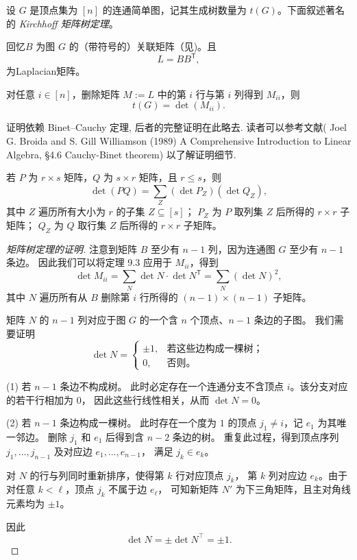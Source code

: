 设 $G$ 是顶点集为 $[n]$ 的连通简单图，记其生成树数量为 $t(G)$。下面叙述著名的
\emph{Kirchhoff 矩阵树定理}。

回忆$B$ 为图 $G$ 的（带符号的）关联矩阵（见)。且
\[
L = B B^{\mathsf T},
\]
为Laplacian矩阵。

\begin{theorem}[矩阵树定理]\label{thm:matrix-tree}
对任意 $i\in[n]$，删除矩阵 $M:=L$ 中的第 $i$ 行与第 $i$ 列得到 $M_{ii}$，则
\[
t(G)=\det(M_{ii}).
\]
\end{theorem}

证明依赖 Binet--Cauchy 定理, 后者的完整证明在此略去. 读者可以参考文献( Joel G. Broida and S. Gill Williamson (1989) A Comprehensive Introduction to Linear Algebra, §4.6 Cauchy-Binet theorem) 以了解证明细节.

\begin{theorem}\label{thm:binet-cauchy}
若 $P$ 为 $r\times s$ 矩阵，$Q$ 为 $s\times r$ 矩阵，且 $r\le s$，则
\[
\det(PQ)=\sum_{Z} (\det P_Z)(\det Q_Z),
\]
其中 $Z$ 遍历所有大小为 $r$ 的子集 $Z\subseteq [s]$；
$P_Z$ 为 $P$ 取列集 $Z$ 后所得的 $r\times r$ 子矩阵；
$Q_Z$ 为 $Q$ 取行集 $Z$ 后所得的 $r\times r$ 子矩阵。
\end{theorem}

\begin{proof}[ 矩阵树定理的证明]
注意到矩阵 $B$ 至少有 $n-1$ 列，因为连通图 $G$ 至少有 $n-1$ 条边。
因此我们可以将定理 9.3 应用于 $M_{ii}$，得到
\[
\det M_{ii}
  = \sum_{N} \det N \cdot \det N^{\mathsf T}
  = \sum_{N} (\det N)^2,
\]
其中 $N$ 遍历所有从 $B$ 删除第 $i$ 行所得的 $(n-1)\times(n-1)$ 子矩阵。

矩阵 $N$ 的 $n-1$ 列对应于图 $G$ 的一个含 $n$ 个顶点、$n-1$ 条边的子图。
我们需要证明
\[
\det N =
\begin{cases}
\pm 1, & \text{若这些边构成一棵树；}\\[4pt]
0,     & \text{否则。}
\end{cases}
\]

{(1) 若 $n-1$ 条边不构成树。}
此时必定存在一个连通分支不含顶点 $i$。该分支对应的若干行相加为 $0$，
因此这些行线性相关，从而 $\det N = 0$。

{(2) 若 $n-1$ 条边构成一棵树。}
此时存在一个度为 $1$ 的顶点 $j_1\neq i$，记 $e_1$ 为其唯一邻边。
删除 $j_1$ 和 $e_1$ 后得到含 $n-2$ 条边的树。
重复此过程，得到顶点序列 $j_1,\dots,j_{n-1}$ 及对应边 $e_1,\dots,e_{n-1}$，
满足 $j_k \in e_k$。

对 $N$ 的行与列同时重新排序，使得第 $k$ 行对应顶点 $j_k$，
第 $k$ 列对应边 $e_k$。由于对任意 $k<\ell$，顶点 $j_k$ 不属于边 $e_\ell$，
可知新矩阵 $N'$ 为下三角矩阵，且主对角线元素均为 $\pm 1$。

因此
\[
\det N = \pm \det N^\top = \pm 1.
\]
\end{proof}

